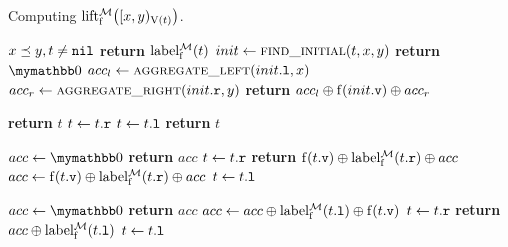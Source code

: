 \documentclass[conference]{IEEEtran}
\newcommand{\return}[0]{\textbf{return }}
\begin{document}
\begin{algorithm}
	\caption{Computing $\operatorname{lift_{\operatorname{f}}^{\mathcal{M}}}\bigl([{x},{y})_{\operatorname{V}(t)}\bigr)$.}\label{alg:aggregate_once}
	\begin{algorithmic}[1]
		\Require $x \preceq y, t \neq \mathtt{nil}$
				\State \return $\operatorname{label_{\operatorname{f}}^{\mathcal{M}}}(t)$
			\EndIf
			\State $init \gets \Call{find\_initial}{t, x, y}$
				\State \return $\neutraladd$
			\Else
				\State $acc_l \gets \Call{aggregate\_left}{\tl{init}, x}$
				\State $acc_r \gets \Call{aggregate\_right}{\tr{init}, y}$
				\State \return $acc_l \oplus \operatorname{f}({init}\mathtt{.v}) \oplus acc_r$
			\EndIf
		\EndProcedure

			\While{$\true$}
					\State \return $t$
					\State $t \gets {t}\mathtt{.r}$
					\State $t \gets {t}\mathtt{.l}$
				\Else
					\State \return $t$
				\EndIf
			\EndWhile
		\EndProcedure

			\State $acc \gets \neutraladd$
			\While{$\true$}
					\State \return $acc$
					\State $t \gets {t}\mathtt{.r}$
					\State \return $\operatorname{f}({t}\mathtt{.v}) \oplus \operatorname{label_{\operatorname{f}}^{\mathcal{M}}}({t}\mathtt{.r}) \oplus acc$
				\Else
					\State $acc \gets \operatorname{f}({t}\mathtt{.v}) \oplus \operatorname{label_{\operatorname{f}}^{\mathcal{M}}}({t}\mathtt{.r}) \oplus acc$
					\State $t \gets {t}\mathtt{.l}$
				\EndIf
			\EndWhile
		\EndProcedure

	

	
			\State $acc \gets \neutraladd$
			\While{$\true$}
					\State \return $acc$
					\State $acc \gets acc \oplus \operatorname{label_{\operatorname{f}}^{\mathcal{M}}}({t}\mathtt{.l}) \oplus \operatorname{f}({t}\mathtt{.v})$
					\State $t \gets {t}\mathtt{.r}$
					\State \return $acc \oplus \operatorname{label_{\operatorname{f}}^{\mathcal{M}}}({t}\mathtt{.l})$
				\Else
					\State $t \gets {t}\mathtt{.l}$
				\EndIf
			\EndWhile
		\EndProcedure
	\end{algorithmic}
\end{algorithm}
\end{document}
